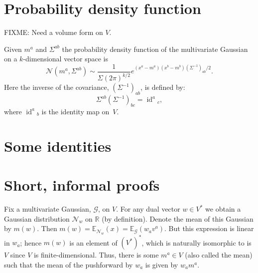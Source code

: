 \documentclass[10pt, a4paper, twocolumn]{article}
\newcommand{\R}{\mathbb{R}}
\newcommand{\E}{\mathbb{E}}
\newcommand{\N}{\mathcal{N}}
\DeclareMathOperator{\id}{id}
\begin{document}
\section{Probability density function}

FIXME: Need a volume form on $V$. 

Given $m^a$ and $\Sigma^{ab}$ the probability density function of the multivariate
Gaussian on a $k$-dimensional vector space is
\begin{equation*}
\N(m^a, \Sigma^{ab}) \sim \frac{1}{\Sigma (2\pi)^{k/2}} e^{(x^a-m^a)(x^b-m^b)(\Sigma^{-1})_{ab}/2}.
\end{equation*}
Here the inverse of the covariance, $(\Sigma^{-1})_{ab}$, is defined by:
\begin{equation*}
\Sigma^{ab} (\Sigma^{-1})_{bc} = \id^a{}_c,
\end{equation*}
where $\id^a{}_b$ is the identity map on~$V$.

\section{Some identities}




\section{Short, informal proofs}

Fix a multivariate Gaussian, $\mathcal{G}$, on $V$. For any dual vector $w\in V^*$
we obtain a Gaussian distribution $\N_w$ on $\R$ (by definition). Denote the
mean of this Gaussian by $m(w)$. Then $m(w) = \E_{\N_w}(x) = \E_\mathcal{G}(w_a
v^a)$. But this expression is linear in $w_a$; hence $m(w)$ is an
element of $(V^*)^*$, which is naturally isomorphic to is $V$ since $V$ is
finite-dimensional. Thus, there is some $m^a\in V$ (also called the mean) such
that the mean of the pushforward by $w_a$ is given by $w_a m^a$.
\end{document}
